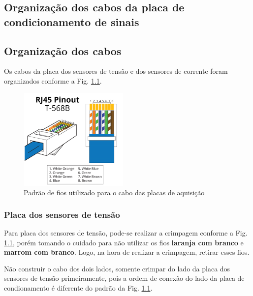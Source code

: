 \begin{apendicesenv}

\partapendices

\chapter{Organização dos cabos da placa de condicionamento de sinais}

\section{Organização dos cabos}

Os cabos da placa dos sensores de tensão e dos sensores de corrente foram organizados conforme a Fig. \ref{fig:padrao_fios}.

\begin{figure}[!hbt]
        \begin{center}
        \includegraphics[width=5 cm, height=5cm]{figuras/T568B.png}
        \caption{Padrão de fios utilizado para o cabo das placas de aquisição}
        \label{fig:padrao_fios}
        \end{center}
\end{figure}

\subsection{Placa dos sensores de tensão}

Para placa dos sensores de tensão, pode-se realizar a crimpagem conforme a Fig. \ref{fig:padrao_fios}, porém tomando o cuidado para não utilizar os fios \textbf{laranja com branco} e \textbf{marrom com branco}. Logo, na hora de realizar a crimpagem, retirar esses fios. 

Não construir o cabo dos dois lados, somente crimpar do lado da placa dos sensores de tensão primeiramente, pois a ordem de conexão do lado da placa de condionamento é diferente do padrão da Fig. \ref{fig:padrao_fios}.


\end{apendicesenv}
